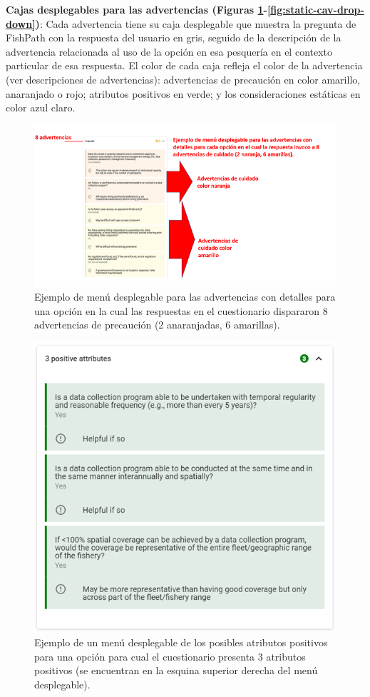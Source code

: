 \documentclass[
  11pt,
]{book}
\begin{document}
\textbf{Cajas desplegables para las advertencias (Figuras \ref{fig:cav-drop-down}-\ref{fig:static-cav-drop-down})}: Cada advertencia tiene su caja desplegable que muestra la pregunta de FishPath con la respuesta del usuario en gris, seguido de la descripción de la advertencia relacionada al uso de la opción en esa pesquería en el contexto particular de esa respuesta. El color de cada caja refleja el color de la advertencia (ver descripciones de advertencias): advertencias de precaución en color amarillo, anaranjado o rojo; atributos positivos en verde; y los consideraciones estáticas en color azul claro.

\begin{figure}

{\centering \includegraphics[width=0.75\linewidth]{images/cav-drop-down-es} 

}

\caption{Ejemplo de menú desplegable para las advertencias con detalles para una opción en la cual las respuestas en el cuestionario dispararon 8 advertencias de precaución (2 anaranjadas, 6 amarillas).}\label{fig:cav-drop-down}
\end{figure}

\begin{figure}

{\centering \includegraphics[width=0.75\linewidth]{images/pos-attr-drop-down-es} 

}

\caption{Ejemplo de un menú desplegable de los posibles atributos positivos para una opción para cual el cuestionario presenta 3 atributos positivos (se encuentran en la esquina superior derecha del menú desplegable).}\label{fig:pos-attr-drop-down}
\end{figure}
\end{document}
